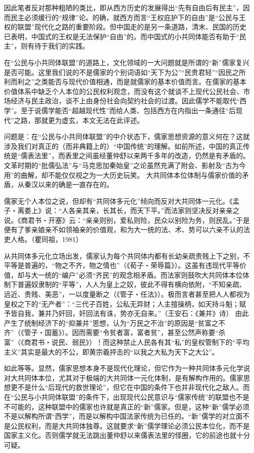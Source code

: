 \documentclass[a4paper,12pt,punct=kaiming,fontset=none]{ctexart}
\begin{document}
因此笔者反对那种粗陋的类比，即从西方历史的发展得出“先有自由后有民主”，因而民主必须缓行的“规律”论。的确，就西方而言“王权庇护下的自由”是“公民与王权的联盟”现代化之路的重要阶段。但中国走的是另一条道路，清末、民国的历史已表明，中国式的王权是无法保护“自由”的。而中国式的小共同体能否有助于“民主”，则有待于我们的实践。

在“公民与小共同体联盟”的道路上，文化领域的一大问题就是所谓的“新”儒家复兴是否可能。这里我们说的不是儒家的个别词语如“天下为公”“民贵君轻”“因民之所利而利之”之类能否与现代价值相通，而是就儒家的基本价值而言。在儒家的基本价值体系中缺乏个人本位的公民权利观念，而没有这个就谈不上现代公民社会、市场经济与民主政治，谈不上由身份社会向契约社会的过渡。因此儒学不能取代“西学”。至于说儒学能否“超越现代性”而给人类、包括西方在内指出一条通往“后现代”之路，那就更为虚玄，本文无法在此评述。

问题是：在“公民与小共同体联盟”的中介状态下，儒家思想资源的意义何在？这就涉及我们对真正的（而非典籍上的）“中国传统”的理解。如前所述，中国的真正传统是“儒表法里”，而表里之间虽经董仲舒以来两千多年的改造，仍然是有矛盾的。文革时期的“批儒弘法”与“马克思加秦始皇”之论虽然充满了附会、影射及“古为今用”的曲解，却不能仅仅视之为一大历史玩笑。 大共同体本位体制与儒家价值的矛盾，从秦汉以来的确是一直存在的。

儒家无个人本位之说，但却有“共同体多元化”倾向而反对大共同体一元化。《孟子・离娄上》说：“人各亲其亲，长其长，而天下平。”而法家则坚决反对亲亲之说。《商君书・开塞》云：“亲亲则别，爱私则险，民众以别险为务，则民乱。”于是便有了爹亲娘亲不如领袖亲的价值观，和为大一统的法、术、势可以六亲不认的法吏人格。（瞿同祖，1981）

从共同体多元化立场出发，儒家认为每个共同体内都有长幼亲疏贵贱上下之别，不平等是普遍的，“物之不齐，物之情也”（《荀子・荣辱篇》）。这虽有违现代平等价值，却与大一统的“编户”必须“齐民”的观念相矛盾。而法家则鼓吹大共同体本位体制下普遍奴隶制的“平等”，人人为皇上之奴，彼此不得有横向依附，“不知亲疏、远近、贵贱、美恶”，一以度量断之（《管子・任法》）。极而言者甚至把人人都视为皇权之下的“无产者”：“三代子百姓，公私无异财；人主擅操柄，如天持斗魁；赋予皆自我，兼并乃奸回，奸回法有诛，势亦无自来。”（王安石：《兼并》诗） 由此产生了统制经济下的“抑兼并”思想，认为“万民之不治”的原因是“贫富之不齐”（《管子・国蓄》）。因而需要“令贫者富，富者贫”，甚至公然声称要“杀富”（《商君书・说民、弱民》）！而这种禁止人民各有其“私”的皇权管制下的“平均主义”其实是最大的不公，即黄宗羲抨击的“以我之大私为天下之大公”。

如此等等。显然，儒家思想本身不是现代化理论，但它作为一种共同体多元化学说对大共同体本位，尤其对于极端的大共同体一元化体制，是有解构作用的。儒家思想更不是什么“后现代的救世理论”，但它在中国的条件下也并非现代化之敌人。而在“公民与小共同体联盟”的条件下，出现现代公民意识与“儒家传统”的联盟也不是不可能的，这种联盟中的儒家也许就是真正的“新”儒家。但是，这种“新”儒学必须不是以解构所谓“西学”，而是以解构中国法家传统为已任的。“新”儒学的对立面不是公民权利，而是大共同体独尊。这就要求“新”儒学理论必须公民本位化，而不是国家主义化。否则儒学就无法跳出董仲舒以来儒表法里的怪圈，它的前途也就十分可疑。
\end{document}
